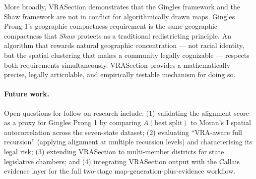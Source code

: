 More broadly, VRASection demonstrates that the Gingles framework and the
Shaw framework are not in conflict for algorithmically drawn maps.
Gingles Prong 1's geographic compactness requirement is the same
geographic compactness that \emph{Shaw} protects as a traditional redistricting
principle.
An algorithm that rewards natural geographic concentration --- not racial
identity, but the spatial clustering that makes a community legally cognizable
--- respects both requirements simultaneously.
VRASection provides a mathematically precise, legally articulable, and
empirically testable mechanism for doing so.

\paragraph{Future work.}
Open questions for follow-on research include:
(1) validating the alignment score as a proxy for Gingles Prong 1 by
comparing $A(\text{best split})$ to Moran's I spatial autocorrelation
across the seven-state dataset;
(2) evaluating ``VRA-aware full recursion'' (applying alignment at multiple
recursion levels) and characterising its legal risk;
(3) extending VRASection to multi-member districts for state legislative
chambers;
and (4) integrating VRASection output with the Callais evidence layer
for the full two-stage map-generation-plus-evidence workflow.
